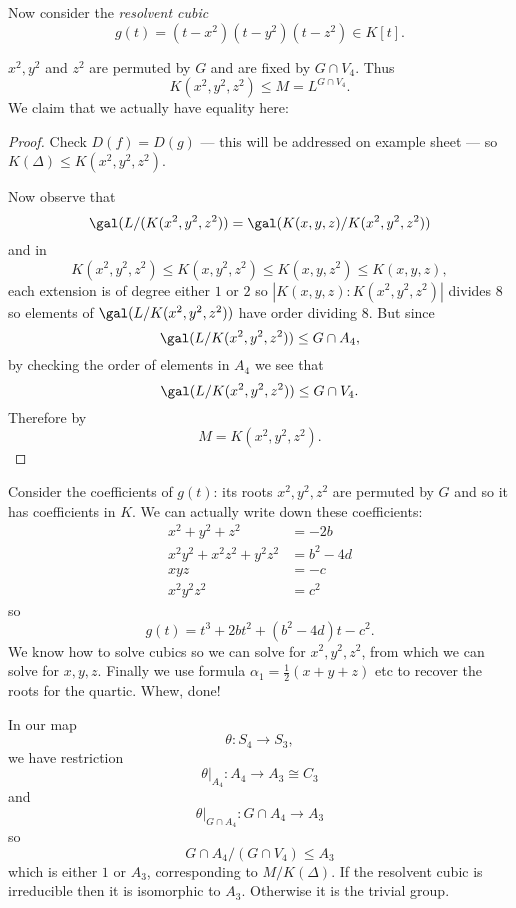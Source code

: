 \documentclass[a4paper]{article}
\begin{document}
Now consider the \emph{resolvent cubic}
\[
  g(t) = (t - x^2) (t - y^2)(t - z^2) \in K[t].
\]

\(x^2, y^2\) and \(z^2\) are permuted by \(G\) and are fixed by \(G \cap V_4\). Thus
\[
  K(x^2, y^2, z^2) \leq M = L^{G \cap V_4}.
\]
We claim that we actually have equality here:

\begin{proof}
 Check \(D(f) = D(g)\) --- this will be addressed on example sheet --- so \(K(\Delta) \leq K(x^2, y^2, z^2)\).

Now observe that
\[
  \gal(L/(K(x^2, y^2, z^2)) = \gal(K(x, y, z)/K(x^2, y^2, z^2))
\]
and in
\[
  K(x^2, y^2, z^2) \leq K(x, y^2, z^2) \leq K(x, y, z^2) \leq K(x, y, z),
\]
each extension is of degree either \(1\) or \(2\) so \(|K(x, y, z):K(x^2, y^2, z^2)|\) divides \(8\) so elements of \(\gal(L/K(x^2, y^2, z^2))\) have order dividing \(8\). But since
\[
  \gal(L/K(x^2, y^2, z^2)) \leq G \cap A_4,
\]
by checking the order of elements in \(A_4\) we see that
\[
  \gal(L/K(x^2, y^2, z^2)) \leq G \cap V_4.
\]
Therefore by 
\[
  M = K(x^2, y^2, z^2).
\]
\end{proof}

Consider the coefficients of \(g(t)\): its roots \(x^2, y^2, z^2\) are permuted by \(G\) and so it has coefficients in \(K\). We can actually write down these coefficients:
\begin{align*}
  x^2 + y^2 + z^2 &= -2b \\
  x^2y^2 + x^2z^2 + y^2z^2 &= b^2 - 4d \\
  xyz &= -c \\
  x^2y^2z^2 &= c^2
\end{align*}
so
\[
  g(t) = t^3 + 2bt^2 + (b^2 - 4d)t - c^2.
\]
We know how to solve cubics so we can solve for \(x^2, y^2, z^2\), from which we can solve for \(x, y, z\). Finally we use formula \(\alpha_1 = \frac{1}{2}(x + y + z)\) etc to recover the roots for the quartic. Whew, done!

\begin{remark}
  In our map
  \[
    \theta: S_4 \to S_3,
  \]
  we have restriction
  \[
    \theta|_{A_4}: A_4 \to A_3 \cong C_3
  \]
  and
  \[
    \theta|_{G \cap A_4}: G \cap A_4 \to A_3
  \]
  so
  \[
    G \cap A_4 /(G \cap V_4) \leq A_3
  \]
  which is either \(1\) or \(A_3\), corresponding to \(M/K(\Delta)\). If the resolvent cubic is irreducible then it is isomorphic to \(A_3\). Otherwise it is the trivial group.
\end{remark}
\end{document}
